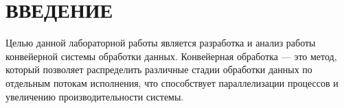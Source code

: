 \chapter*{\centering ВВЕДЕНИЕ}

Целью данной лабораторной работы является разработка и анализ работы конвейерной системы обработки данных. Конвейерная обработка — это метод, который позволяет распределить различные стадии обработки данных по отдельным потокам исполнения, что способствует параллелизации процессов и увеличению производительности системы.